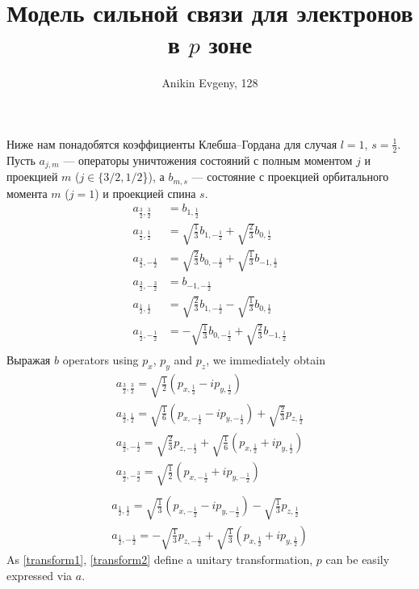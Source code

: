 \documentclass{article}
\title{Модель сильной связи для электронов в $p$ зоне}
\author{Anikin Evgeny, 128}
\begin{document}
\maketitle

Ниже нам понадобятся коэффициенты Клебша--Гордана для случая $l = 1$, 
$s = \frac{1}{2}$. Пусть $a_{j,m}$ --- операторы уничтожения состояний с полным моментом $j$
и проекцией $m$ ($j \in \{3/2, 1/2$\}), а $b_{m, s}$ --- состояние с проекцией орбитального
момента $m$ ($j = 1$) и проекцией спина $s$.
\begin{equation}
	\begin{split}
		a_{\frac 32, \frac 32} &= b_{1,\frac 12}\\
		a_{\frac 32, \frac 12} &= \sqrt{\frac 13}b_{1, -\frac 12} 
		    + \sqrt{\frac 23} b_{0, \frac 12}\\
		a_{\frac 32, -\frac 12} &= \sqrt{\frac 23} b_{0, -\frac 12} +
		    	\sqrt{\frac 13}b_{-1, \frac 12} \\
		a_{\frac 32, -\frac 32} &= b_{-1,-\frac 12}\\
		a_{\frac 12, \frac 12} &= \sqrt{\frac 23} b_{1, -\frac 12} -
		    	\sqrt{\frac 13}b_{0, \frac 12} \\
		a_{\frac 12, -\frac 12} &= -\sqrt{\frac 13}b_{0, -\frac 12} 
			+ \sqrt{\frac 23} b_{-1, \frac 12}\\
	\end{split}
\end{equation}
Выражая $b$ operators using $p_x$, $p_y$ and $p_z$, we immediately obtain
\begin{equation}
	\label{transform1}
	\begin{gathered}
		a_{\frac{3}{2}, \frac{3}{2}} = 
			\sqrt{\frac{1}{2}} \left(p_{x,\frac{1}{2}} - i p_{y,\frac{1}{2}}\right)\\
		a_{\frac{3}{2}, \frac{1}{2}} = 
			\sqrt{\frac{1}{6}} \left(p_{x,-\frac{1}{2}} - i p_{y,-\frac{1}{2}}\right) 
				+ \sqrt{\frac{2}{3}} p_{z, \frac{1}{2}}\\
		a_{\frac{3}{2}, -\frac{1}{2}} = 
			\sqrt{\frac{2}{3}} p_{z, -\frac{1}{2}}+
				\sqrt{\frac{1}{6}} \left(p_{x,\frac{1}{2}} + i p_{y,\frac{1}{2}}\right) \\
		a_{\frac{3}{2}, -\frac{3}{2}} = 
			\sqrt{\frac{1}{2}} \left(p_{x,-\frac{1}{2}} + i p_{y,-\frac{1}{2}}\right)\\
	\end{gathered}
\end{equation}
\begin{equation}
	\label{transform2}
	\begin{gathered}
		a_{\frac{1}{2}, \frac{1}{2}} = 
			\sqrt{\frac{1}{3}}\left(p_{x, -\frac{1}{2}} - ip_{y,-\frac{1}{2}}\right) - 
				\sqrt{\frac{1}{3}} p_{z,\frac{1}{2}}\\
		a_{\frac{1}{2}, -\frac{1}{2}} = 
			-\sqrt{\frac{1}{3}} p_{z,-\frac{1}{2}} + 
				\sqrt{\frac{1}{3}}\left(p_{x, \frac{1}{2}} + ip_{y,\frac{1}{2}}\right)
	\end{gathered}
\end{equation}
As \eqref{transform1}, \eqref{transform2} define a unitary transformation, $p$ can be easily
expressed via $a$.
\end{document}

